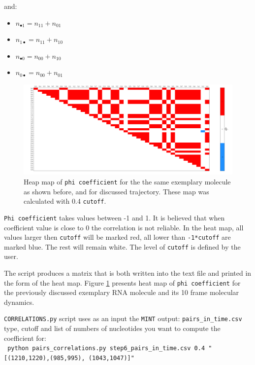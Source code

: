 \documentclass[12pt]{article}
\begin{document}
and:
\begin{itemize}
\item $n_{\bullet1} = n_{11}+n_{01}$
\item $n_{1\bullet} = n_{11}+n_{10}$
\item $n_{\bullet0} = n_{00}+n_{10}$
\item $n_{0\bullet} = n_{00}+n_{01}$
\end{itemize}

\begin{figure}[h!]
\label{coefficient}
\centering
\includegraphics[scale=0.4]{./pictures/correlation_matrix.png}
\caption{Heap map of \texttt{phi coefficient} for the the same exemplary molecule as shown before, and for discussed trajectory. These map was calculated with 0.4 \texttt{cutoff}.}
\end{figure}

\texttt{Phi coefficient} takes values between -1 and 1. It is believed that when coefficient value is close to 0 the correlation is not reliable. In the heat map, all values larger then \texttt{cutoff} will be marked red, all lower than \texttt{-1*cutoff} are marked blue. The rest will remain white. The level of \texttt{cutoff} is defined by the user.

The script produces a matrix that is both written into the text file and printed in the form of the heat map. Figure \ref{coefficient} presents heat map of \texttt{phi coefficient} for the previously discussed exemplary RNA molecule and its 10 frame molecular dynamics.

\texttt{CORRELATIONS.py} script uses as an input the \texttt{MINT} output: \texttt{pairs\_in\_time.csv} type, cutoff and list of numbers of nucleotides you want to compute the coefficient for:\\

\texttt{ python pairs\_correlations.py step6\_pairs\_in\_time.csv 0.4 "[(1210,1220),(985,995), (1043,1047)]"} \\
\end{document}

